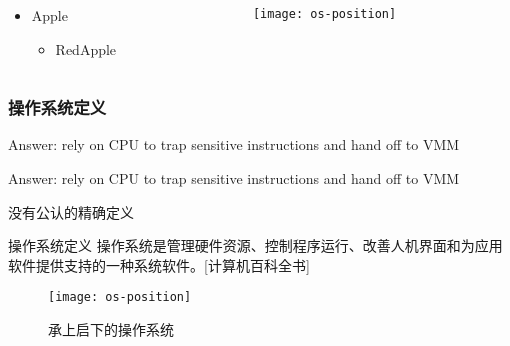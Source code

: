 \begin{frame}[t]
	\frametitle{ }
	\begin{columns}[t]
		\begin{column}{.5\textwidth}
			
			\begin{itemize}\Large
				\item Apple
				\begin{itemize}\large
					\item RedApple
					
				\end{itemize}
			\end{itemize}
			
		\end{column}
		
		\begin{column}{.5\textwidth}
			
		\texttt{[image: os-position]}
			
		\end{column}
	\end{columns}
\end{frame}

\begin{frame}[plain]	
	\frametitle{}
	
	
\end{frame}
\begin{frame}[plain]
	
	\frametitle{操作系统定义}
	
	\begin{flushleft} %
		Answer: rely on CPU to trap sensitive instructions and hand off to VMM
	\end{flushleft}


	\begin{flushright} %
	Answer: rely on CPU to trap sensitive instructions and hand off to VMM
	\end{flushright}


	没有公认的精确定义 \pause
	
	\begin{block}{操作系统定义}
		操作系统是管理硬件资源、控制程序运行、改善人机界面和为应用软件提供支持的一种系统软件。[计算机百科全书]
	\end{block} \pause
	
	
	\begin{figure}
		\centering
		\texttt{[image: os-position]}
		\caption{承上启下的操作系统}
	\end{figure}
	
\end{frame}

